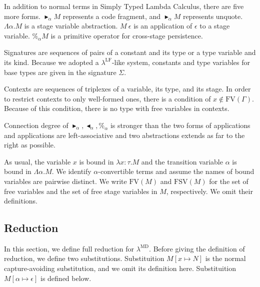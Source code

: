 \documentclass[runningheads]{llncs}
\newcommand{\LMD}{$\lambda^{\textrm{MD}}$}
\newcommand{\LLF}{$\lambda^{\textrm{LF}}$}
\newcommand{\G}{\Gamma}
\newcommand{\TB}{\blacktriangleright}
\newcommand{\TBL}{\blacktriangleleft}
\newcommand{\FV}{\text{FV}}
\newcommand{\FTV}{\text{FSV}}
\begin{document}
In addition to normal terms in Simply Typed Lambda Calculus, there are five more forms.
$\TB_\alpha M$ represents a code fragment, and $\TB_\alpha M$ represents unquote.
$\Lambda\alpha.M$ is a stage variable abstraction.
$M\ \epsilon$ is an application of $\epsilon$ to a stage variable.
$\%_\alpha M$ is a primitive operator for cross-stage persistence.

Signatures are sequences of pairs of a constant and its type or a type variable and its kind.
Because we adopted a \LLF-like system, constants and type variables for base types are given in the signature $\Sigma$.

Contexts are sequences of triplexes of a variable, its type, and its stage.
In order to restrict contexts to only well-formed ones, there is a condition of $x\notin\FV(\G)$.
Because of this condition, there is no type with free variables in contexts.

Connection degree of $\TB_\alpha, \TBL_\alpha, \%_\alpha$ is stronger than the two forms of applications
and applications are left-associative
and two abstractions extends as far to the right as possible.


As usual, the variable $x$ is bound in $\lambda x:\tau.M$
and the transition variable $\alpha$ is bound in $\Lambda \alpha.M$.
We identify $\alpha$-convertible terms and assume the names of bound variables are pairwise distinct.
We write $\FV(M)$ and $\FTV(M)$ for the set of free variables and the set of free stage variables in $M$, respectively.
We omit their definitions.

\subsection{Reduction}

In this section, we define full reduction for \LMD.
Before giving the definition of reduction, we define two substitutions.
Substituition $M[x\mapsto N]$ is the normal capture-avoiding substitution, and we omit its definition here.
Substituition $M[\alpha \mapsto \epsilon]$ is defined below.
\end{document}
